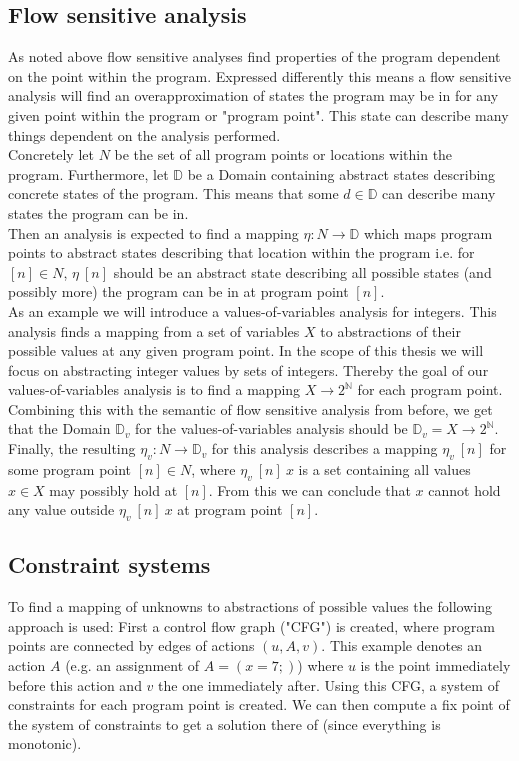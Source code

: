     \subsection{Flow sensitive analysis}
    As noted above flow sensitive analyses find properties of the program dependent on the point within the program. Expressed differently this means a flow sensitive analysis will find an overapproximation of states the program may be in for any given point within the program or "program point". This state can describe many things dependent on the analysis performed.\\
    Concretely let $N$ be the set of all program points or locations within the program. Furthermore, let $\mathbb{D}$ be a Domain containing abstract states describing concrete states of the program. This means that some $d \in \mathbb{D}$ can describe many states the program can be in.\\ 
    Then an analysis is expected to find a mapping $\eta: N \rightarrow \mathbb{D}$ which maps program points to abstract states describing that location within the program i.e. for $[n] \in N$, $\eta\ [n]$ should be an abstract state describing all possible states (and possibly more) the program can be in at program point $[n]$.\\
    As an example we will introduce a values-of-variables analysis for integers. This analysis finds a mapping from a set of variables $X$ to abstractions of their possible values at any given program point. In the scope of this thesis we will focus on abstracting integer values by sets of integers. Thereby the goal of our values-of-variables analysis is to find a mapping $X \rightarrow 2^\mathbb{N}$ for each program point.\\
    Combining this with the semantic of flow sensitive analysis from before, we get that the Domain $\mathbb{D}_v$ for the values-of-variables analysis should be $\mathbb{D}_v = X \rightarrow 2^\mathbb{N}$. Finally, the resulting $\eta_v: N \rightarrow \mathbb{D}_v$ for this analysis describes a mapping $\eta_v\ [n]$ for some program point $[n] \in N$, where $\eta_v\ [n]\ x$ is a set containing all values $x \in X$ may possibly hold at $[n]$. From this we can conclude that $x$ cannot hold any value outside $\eta_v\ [n]\ x$ at program point $[n]$.

    \subsection{Constraint systems}
    To find a mapping of unknowns to abstractions of possible values the following approach is used: First a control flow graph ("CFG") is created, where program points are connected by edges of actions $(u, A, v)$. This example denotes an action $A$ (e.g. an assignment of $A = (x = 7;)$) where $u$ is the point immediately before this action and $v$ the one immediately after. Using this CFG, a system of constraints for each program point is created. We can then compute a fix point of the system of constraints to get a solution there of (since everything is monotonic).

  



